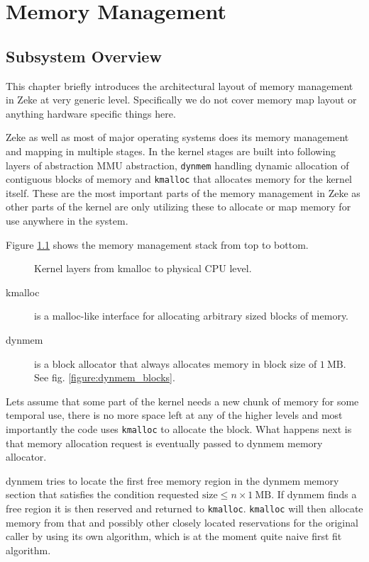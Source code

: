 \part{Memory Management}

\chapter{Subsystem Overview}

This chapter briefly introduces the architectural layout of memory management
in Zeke at very generic level. Specifically we do not cover memory map layout or
anything hardware specific things here.

Zeke as well as most of major operating systems does its memory management and
mapping in multiple stages. In the kernel stages are built into following layers
of abstraction \ac{MMU} abstraction, \verb+dynmem+ handling dynamic allocation
of contiguous blocks of memory and \verb+kmalloc+ that allocates memory for the
kernel itself. These are the most important parts of the memory management in
Zeke as other parts of the kernel are only utilizing these to allocate or map
memory for use anywhere in the system.

Figure \ref{figure:mm_layers} shows the memory management stack from
top to bottom.

\begin{figure}
  
  \centering
  \caption{Kernel layers from kmalloc to physical \acs{CPU} level.}
  \label{figure:mm_layers}
\end{figure}

\begin{description}
\item[kmalloc] is a malloc-like interface for allocating arbitrary sized blocks
  of memory.
\item[dynmem] is a block allocator that always allocates memory in block size of
  $1 \:\textrm{MB}$. See fig. \ref{figure:dynmem_blocks}.
\end{description}

Lets assume that some part of the kernel needs a new chunk of memory for some
temporal use, there is no more space left at any of the higher levels and most
importantly the code uses \verb+kmalloc+ to allocate the block. What happens
next is that memory allocation request is eventually passed to dynmem memory
allocator.

dynmem tries to locate the first free memory region in the dynmem memory section
that satisfies the condition
$\textrm{requested size} \le n \times 1 \:\textrm{MB}$. If dynmem finds a free
region it is then reserved and returned to \verb+kmalloc+. \verb+kmalloc+ will
then allocate memory from that and possibly other closely located reservations
for the original caller by using its own algorithm, which is at the moment quite
naive first fit algorithm.

